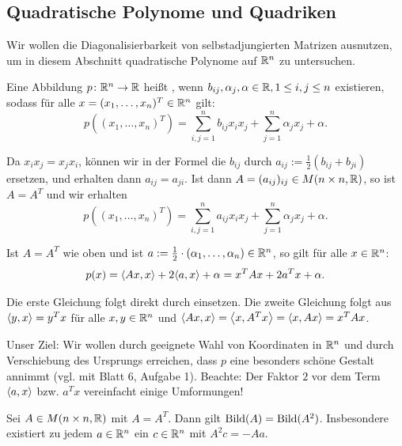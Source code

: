 \subsection{Quadratische Polynome und Quadriken}
\label{sec:2.8}

Wir wollen die Diagonalisierbarkeit von selbstadjungierten Matrizen ausnutzen, um in diesem Abschnitt quadratische Polynome auf $\mathbb{R}^n$ zu untersuchen.

\begin{definition}
	\label{def:8.1}
	Eine Abbildung $p \colon \mathbb{R}^n \rightarrow \mathbb{R}$ heißt , wenn $b_{ij}, \alpha_j, \alpha \in \mathbb{R}, 1 \leq i,j \leq n$ existieren, sodass für alle $x = (x_1,\dots,x_n)^T \in \mathbb{R}^n$ gilt:
	\[
		p((x_1,\dots,x_n)^T) = \sum_{i,j=1}^{n} b_{ij} x_i x_j + \sum_{j=1}^{n} \alpha_j x_j + \alpha.
	\]
\end{definition}

Da $x_ix_j = x_jx_i$, können wir in der Formel die $b_{ij}$ durch $a_{ij} := \frac{1}{2}(b_{ij} + b_{ji})$ ersetzen, und erhalten dann $a_{ij} = a_{ji}$.
Ist dann $A = (a_{ij})_{ij} \in M(n \times n, \mathbb{R})$, so ist $A = A^T$ und wir erhalten
\[
	p((x_1,\dots,x_n)^T) = \sum_{i,j=1}^{n} a_{ij} x_i x_j + \sum_{j=1}^{n} \alpha_j x_j + \alpha.
\]

\begin{lemma}
	\label{lemma:8.2}
	Ist $A = A^T$ wie oben und ist $a := \frac{1}{2} \cdot (\alpha_1,\dots,\alpha_n) \in \mathbb{R}^n$, so gilt für alle $x \in \mathbb{R}^n$:
	\[
		p(x) = \sk{Ax,x} + 2 \sk{a,x} + \alpha = x^T A x + 2 a^T x + \alpha.
	\]
\end{lemma}

\begin{beweis}
	Die erste Gleichung folgt direkt durch einsetzen.
	Die zweite Gleichung folgt aus $\left\langle y,x\right\rangle = y^Tx$ für alle $x,y \in \mathbb{R}^n$ und $\left\langle Ax,x\right\rangle = \left\langle x,A^Tx\right\rangle = \left\langle x,Ax\right\rangle = x^T Ax$. 
\end{beweis}

Unser Ziel: Wir wollen durch geeignete Wahl von Koordinaten in $\mathbb{R}^n$ und durch Verschiebung des Ursprungs erreichen, dass $p$ eine besonders schöne Gestalt annimmt (vgl. mit Blatt 6, Aufgabe 1).
Beachte: Der Faktor $2$ vor dem Term $\left\langle a,x\right\rangle$ bzw. $a^Tx$ vereinfacht einige Umformungen!

\begin{lemma}
	\label{lemma:8.3}
	Sei $A \in M(n \times n,\mathbb{R})$ mit $A = A^T$.
	Dann gilt $\operatorname{Bild}(A) = \operatorname{Bild}(A^2)$.
	Insbesondere existiert zu jedem $a \in \mathbb{R}^n$ ein $c \in \mathbb{R}^n$ mit $A^2c = -Aa$.
\end{lemma}

